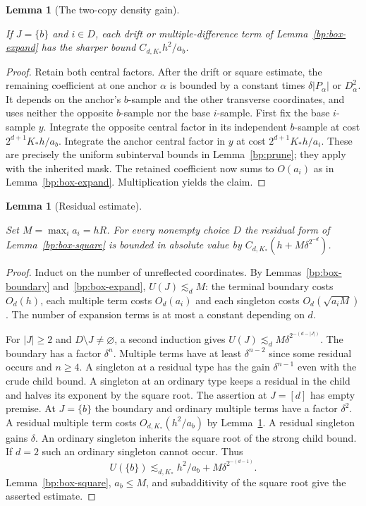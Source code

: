 \documentclass[11pt,letterpaper]{article}
\newtheorem{lemma}[theorem]{Lemma}
\theoremstyle{definition}
\providecommand{\lean}[1]{}
\providecommand{\uses}[1]{}
\begin{document}
\begin{lemma}[The two-copy density gain]\label{bp:two-copy}
\lean{TwistedParaproduct.twoCopy}
If \(J=\{b\}\) and \(i\in D\), each drift or multiple-difference term
of Lemma~\ref{bp:box-expand} has the sharper bound
\(C_{d,K_*}h^2/a_b\).
\end{lemma}
\begin{proof}
\uses{bp:prune,bp:box-expand,bp:marginal,bp:residual-drift}
Retain both central factors. After the drift or square estimate, the
remaining coefficient at one anchor \(\alpha\) is bounded by a
constant times \(\delta |P_\alpha|\) or \(D_\alpha^2\).
It depends on the anchor's \(b\)-sample and the other transverse
coordinates, and uses neither the opposite \(b\)-sample nor the base
\(i\)-sample. First fix the base \(i\)-sample \(y\). Integrate the
opposite central factor in its independent \(b\)-sample at cost
\(2^{d+1}K_*h/a_b\). Integrate the anchor central factor in \(y\) at
cost \(2^{d+1}K_*h/a_i\). These are precisely the uniform subinterval
bounds in Lemma~\ref{bp:prune}; they apply with the inherited mask.
The retained coefficient now sums to \(O(a_i)\) as in
Lemma~\ref{bp:box-expand}. Multiplication yields the claim.
\end{proof}

\begin{lemma}[Residual estimate]\label{bp:residual}
\lean{TwistedParaproduct.residual}
Set \(M=\max_i a_i=hR\). For every nonempty choice \(D\) the residual
form of Lemma~\ref{bp:box-square} is bounded in absolute value by
\(C_{d,K_*}(h+M\delta^{2^{-d}})\).
\end{lemma}
\begin{proof}
\uses{bp:box-boundary,bp:box-expand,bp:two-copy,bp:box-square,bp:energy-def}
Induct on the number of unreflected coordinates. By
Lemmas~\ref{bp:box-boundary} and~\ref{bp:box-expand}, \(U(J)\lesssim_d M\):
the terminal boundary costs \(O_d(h)\), each multiple term costs
\(O_d(a_i)\) and each singleton costs \(O_d(\sqrt{a_iM})\).
The number of expansion terms is at most a constant depending on \(d\).

For \(|J|\ge2\) and \(D\setminus J\ne\varnothing\), a second induction
gives \(U(J)\lesssim_d M\delta^{2^{-(d-|J|)}}\).
The boundary has a factor \(\delta^n\). Multiple terms have at least
\(\delta^{n-2}\) since some residual occurs and \(n\ge4\).
A singleton at a residual type has the gain \(\delta^{n-1}\) even with
the crude child bound. A singleton at an ordinary type keeps a residual
in the child and halves its exponent by the square root.
The assertion at \(J=[d]\) has empty premise.
At \(J=\{b\}\) the boundary and ordinary multiple terms have a factor
\(\delta^2\). A residual multiple term costs \(O_{d,K_*}(h^2/a_b)\)
by Lemma~\ref{bp:two-copy}. A residual singleton gains \(\delta\).
An ordinary singleton inherits the square root of the strong child
bound. If \(d=2\) such an ordinary singleton cannot occur. Thus
\[
 U(\{b\})\lesssim_{d,K_*} h^2/a_b+M\delta^{2^{-(d-1)}} .
\]
Lemma~\ref{bp:box-square}, \(a_b\le M\), and subadditivity of the square
root give the asserted estimate.
\end{proof}
\end{document}

